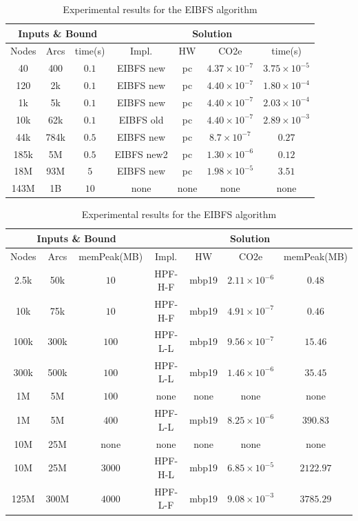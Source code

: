 \documentclass[a4paper,singleside,12pt]{report} %
\begin{document}
\begin{table}[h!]
    \centering
    \begin{tabular}{|ccc|cccc|}
        \hline
        \multicolumn{3}{|c|}{Inputs \& Bound} & \multicolumn{4}{c|}{Solution} \\
        \hline
        Nodes & Arcs & time(s) & Impl. & HW & CO2e & time(s) \\
        \hline
        40 & 400 & $0.1$ & EIBFS new & pc & $4.37 \times 10^{-7}$ & $3.75 \times 10^{-5}$ \\
        120 & 2k & $0.1$ & EIBFS new & pc & $4.40 \times 10^{-7}$ & $1.80 \times 10^{-4}$ \\
        1k & 5k & $0.1$ & EIBFS new & pc & $4.40 \times 10^{-7}$ & $2.03 \times 10^{-4}$ \\
        10k & 62k & $0.1$ & EIBFS old & pc & $4.40 \times 10^{-7}$ & $2.89 \times 10^{-3}$ \\
        44k & 784k & $0.5$ & EIBFS new & pc & $8.7 \times 10^{-7}$ & $0.27$ \\
        185k & 5M & $0.5$ & EIBFS new2 & pc & $1.30 \times 10^{-6}$ & $0.12$ \\
        18M & 93M & $5$ & EIBFS new & pc & $1.98 \times 10^{-5}$& $3.51$ \\
        143M & 1B & $10$ & none & none & none & none \\
        \hline
    \end{tabular}
    \caption{Experimental results for the EIBFS algorithm}
    \label{tab:eibfs_results}
\end{table}

\begin{table}[h!]
    \centering
    \begin{tabular}{|ccc|cccc|}
        \hline
        \multicolumn{3}{|c|}{Inputs \& Bound} & \multicolumn{4}{c|}{Solution} \\
        \hline
        Nodes & Arcs & memPeak(MB) & Impl. & HW & CO2e & memPeak(MB) \\
        \hline
        2.5k & 50k & $10$ & HPF-H-F & mbp19 & $2.11 \times 10^{-6}$ & $0.48$ \\
        10k & 75k & $10$ & HPF-H-F & mbp19 & $4.91 \times 10^{-7}$ & $0.46$ \\
        100k & 300k & $100$ & HPF-L-L & mbp19 & $9.56 \times 10^{-7}$ & $15.46$ \\
        300k & 500k & $100$ & HPF-L-L & mbp19 & $1.46 \times 10^{-6}$ & $35.45$ \\
        1M & 5M & $100$ & none & none & none & none \\
        1M & 5M & $400$ & HPF-L-L & mpb19 & $8.25 \times 10^{-6}$ & $390.83$ \\
        10M & 25M & none & none & none & none & none \\
        10M & 25M & $3000$ & HPF-H-L & mbp19 & $6.85 \times 10^{-5}$ & $2122.97$ \\
        125M & 300M & $4000$ & HPF-L-F & mbp19 & $9.08 \times 10^{-3}$ & $3785.29$ \\
        \hline
    \end{tabular}
    \caption{Experimental results for the EIBFS algorithm}
    \label{tab:hpf_results}
\end{table}
\end{document}

